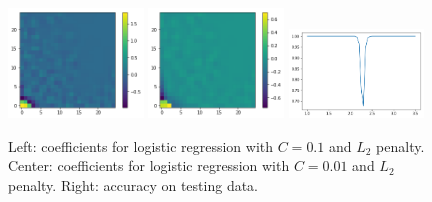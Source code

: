\documentclass[11pt]{article}
\begin{document}
\begin{figure}[h]
    \centering
    \includegraphics[width=0.32\textwidth]{ising_images/logreg_2d_ising}
    \includegraphics[width=0.32\textwidth]{ising_images/logreg2_2d_ising}
    \includegraphics[width=0.32\textwidth]{ising_images/logreg_acc_2d_ising}
    \caption{Left: coefficients for logistic regression with $C=0.1$ and $L_2$ penalty. Center: coefficients for logistic regression with $C=0.01$ and $L_2$ penalty. Right: accuracy on testing data.}
    \label{fig:IsingLogReg}
\end{figure}
\end{document}
